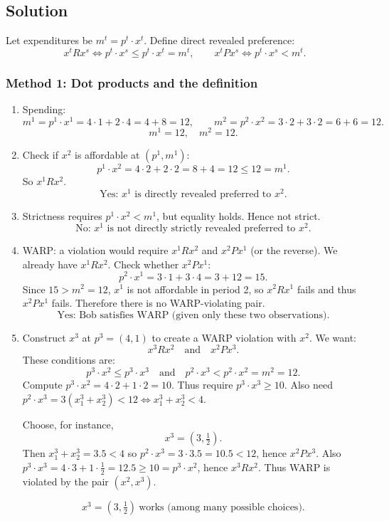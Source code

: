 \documentclass[12pt]{article}
\newcommand{\dotp}{\cdot}
\begin{document}
\subsection*{Solution}
Let expenditures be \(m^{t}=p^{t}\dotp x^{t}\). Define direct revealed preference:
\[
x^{t}R x^{s}\iff p^{t}\dotp x^{s}\le p^{t}\dotp x^{t}=m^t,\qquad
x^{t}P x^{s}\iff p^{t}\dotp x^{s}<m^t.
\]

\subsubsection*{Method 1: Dot products and the definition}
\begin{enumerate}[label=(\alph*), leftmargin=*]
\item Spending:
\[
m^1=p^1\dotp x^1=4\cdot 1+2\cdot 4=4+8=12,
\qquad
m^2=p^2\dotp x^2=3\cdot 2+3\cdot 2=6+6=12.
\]
\[
\boxed{m^1=12,\quad m^2=12.}
\]

\item Check if \(x^2\) is affordable at \((p^1,m^1)\):
\[
p^1\dotp x^2=4\cdot 2+2\cdot 2=8+4=12\le 12=m^1.
\]
So \(x^1 R x^2\).
\[
\boxed{\text{Yes: }x^1\text{ is directly revealed preferred to }x^2.}
\]

\item Strictness requires \(p^1\dotp x^2<m^1\), but equality holds. Hence not strict.
\[
\boxed{\text{No: }x^1\text{ is not directly strictly revealed preferred to }x^2.}
\]

\item WARP: a violation would require \(x^1 R x^2\) and \(x^2 P x^1\) (or the reverse).
We already have \(x^1 R x^2\). Check whether \(x^2 P x^1\):
\[
p^2\dotp x^1=3\cdot 1+3\cdot 4=3+12=15.
\]
Since \(15>m^2=12\), \(x^1\) is not affordable in period 2, so \(x^2 R x^1\) fails and thus \(x^2 P x^1\) fails.
Therefore there is no WARP-violating pair.
\[
\boxed{\text{Yes: Bob satisfies WARP (given only these two observations).}}
\]

\item Construct \(x^3\) at \(p^3=(4,1)\) to create a WARP violation with \(x^2\).
We want:
\[
x^3 R x^2 \quad\text{and}\quad x^2 P x^3.
\]
These conditions are:
\[
p^3\dotp x^2 \le p^3\dotp x^3 \quad\text{and}\quad p^2\dotp x^3 < p^2\dotp x^2=m^2=12.
\]
Compute \(p^3\dotp x^2=4\cdot 2+1\cdot 2=10\). Thus require \(p^3\dotp x^3\ge 10\).
Also need \(p^2\dotp x^3=3(x_1^3+x_2^3)<12\iff x_1^3+x_2^3<4\).

Choose, for instance,
\[
x^3=(3,\tfrac12).
\]
Then \(x_1^3+x_2^3=3.5<4\) so \(p^2\dotp x^3=3\cdot 3.5=10.5<12\), hence \(x^2 P x^3\).
Also \(p^3\dotp x^3=4\cdot 3+1\cdot \tfrac12=12.5\ge 10=p^3\dotp x^2\), hence \(x^3 R x^2\).
Thus WARP is violated by the pair \((x^2,x^3)\).

\[
\boxed{x^3=(3,\tfrac12)\ \text{works (among many possible choices).}}
\]
\end{enumerate}
\end{document}
